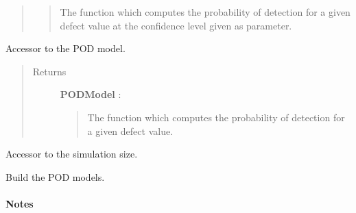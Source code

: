 \documentclass[letterpaper,10pt,english]{sphinxmanual}
\begin{document}
\begin{fulllineitems}
\begin{fulllineitems}
\begin{quote}
\begin{description}
\begin{quote}
The function which computes the probability of detection for a given
defect value at the confidence level given as parameter.
\end{quote}

\end{description}\end{quote}

\end{fulllineitems}


\begin{fulllineitems}
\label{_generated/otpod.UnivariateLinearModelPOD:otpod.UnivariateLinearModelPOD.getPODModel}
Accessor to the POD model.
\begin{quote}\begin{description}
\item[{Returns}] \leavevmode
\textbf{PODModel} : \href{http://doc.openturns.org/openturns-latest/sphinx/user\_manual/\_generated/openturns.NumericalMathFunction.html\#openturns.NumericalMathFunction}{}
\begin{quote}

The function which computes the probability of detection for a given
defect value.
\end{quote}

\end{description}\end{quote}

\end{fulllineitems}


\begin{fulllineitems}
\label{_generated/otpod.UnivariateLinearModelPOD:otpod.UnivariateLinearModelPOD.getSimulationSize}
Accessor to the simulation size.

\end{fulllineitems}


\begin{fulllineitems}
\label{_generated/otpod.UnivariateLinearModelPOD:otpod.UnivariateLinearModelPOD.run}
Build the POD models.
\paragraph{Notes}


\end{fulllineitems}
\end{fulllineitems}
\end{document}
